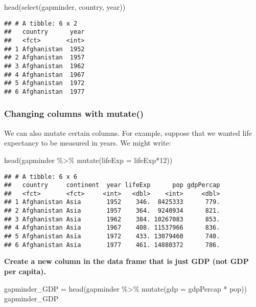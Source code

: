 \documentclass[
]{article}
\newenvironment{Shaded}{\begin{snugshade}}{\end{snugshade}}
\newcommand{\AttributeTok}[1]{\textcolor[rgb]{0.77,0.63,0.00}{#1}}
\newcommand{\DecValTok}[1]{\textcolor[rgb]{0.00,0.00,0.81}{#1}}
\newcommand{\FunctionTok}[1]{\textcolor[rgb]{0.00,0.00,0.00}{#1}}
\newcommand{\NormalTok}[1]{#1}
\newcommand{\OtherTok}[1]{\textcolor[rgb]{0.56,0.35,0.01}{#1}}
\newcommand{\SpecialCharTok}[1]{\textcolor[rgb]{0.00,0.00,0.00}{#1}}
\begin{document}
\begin{Shaded}
\begin{Highlighting}[]
\FunctionTok{head}\NormalTok{(}\FunctionTok{select}\NormalTok{(gapminder, country, year))}
\end{Highlighting}
\end{Shaded}

\begin{verbatim}
## # A tibble: 6 x 2
##   country      year
##   <fct>       <int>
## 1 Afghanistan  1952
## 2 Afghanistan  1957
## 3 Afghanistan  1962
## 4 Afghanistan  1967
## 5 Afghanistan  1972
## 6 Afghanistan  1977
\end{verbatim}

\hypertarget{changing-columns-with-mutate}{%
\subsubsection{Changing columns with
mutate()}\label{changing-columns-with-mutate}}

We can also mutate certain columns. For example, suppose that we wanted
life expectancy to be measured in years. We might write:

\begin{Shaded}
\begin{Highlighting}[]
\FunctionTok{head}\NormalTok{(gapminder }\SpecialCharTok{\%\textgreater{}\%}
    \FunctionTok{mutate}\NormalTok{(}\AttributeTok{lifeExp =}\NormalTok{ lifeExp}\SpecialCharTok{*}\DecValTok{12}\NormalTok{))}
\end{Highlighting}
\end{Shaded}

\begin{verbatim}
## # A tibble: 6 x 6
##   country     continent  year lifeExp      pop gdpPercap
##   <fct>       <fct>     <int>   <dbl>    <int>     <dbl>
## 1 Afghanistan Asia       1952    346.  8425333      779.
## 2 Afghanistan Asia       1957    364.  9240934      821.
## 3 Afghanistan Asia       1962    384. 10267083      853.
## 4 Afghanistan Asia       1967    408. 11537966      836.
## 5 Afghanistan Asia       1972    433. 13079460      740.
## 6 Afghanistan Asia       1977    461. 14880372      786.
\end{verbatim}

\textbf{Create a new column in the data frame that is just GDP (not GDP
per capita).}

\begin{Shaded}
\begin{Highlighting}[]
\NormalTok{gapminder\_GDP }\OtherTok{=} \FunctionTok{head}\NormalTok{(gapminder }\SpecialCharTok{\%\textgreater{}\%}
                    \FunctionTok{mutate}\NormalTok{(}\AttributeTok{gdp =}\NormalTok{ gdpPercap }\SpecialCharTok{*}\NormalTok{ pop))}
\NormalTok{gapminder\_GDP}
\end{Highlighting}
\end{Shaded}
\end{document}
